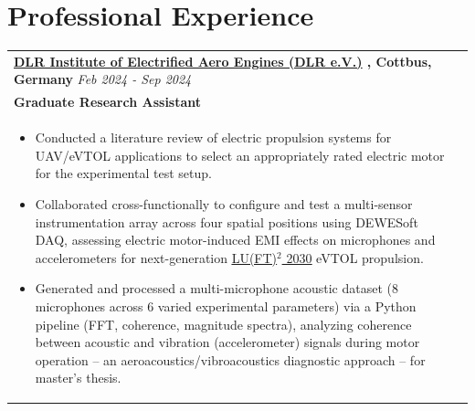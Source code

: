 \documentclass[a4paper,8pt]{article}
\newcommand{\ulhref}[2]{%
  {\hypersetup{urlcolor=.}\textcolor{.}{\href{#1}{\uline{#2}}}}%
}
\begin{document}
\section{Professional Experience}
\begin{tabularx}{\linewidth}{ @{}l r@{} }
\textbf{{\ulhref{https://www.dlr.de/}{DLR Institute of Electrified Aero Engines (DLR e.V.)}}, Cottbus, Germany} \hfill \color[HTML]{371e77} \textit{Feb 2024 - Sep 2024} \\[1pt]
\color[HTML]{371e77}\textbf{Graduate Research Assistant}\ \hfill \color[HTML]{4B28A4} \\[1pt]
\begin{minipage}[t]{\linewidth}
    \begin{itemize}[nosep,after=\strut, leftmargin=*, itemsep=1pt]
        \item Conducted a literature review of electric propulsion systems for UAV/eVTOL applications to select an appropriately rated electric motor for the experimental test setup.
        \item Collaborated cross-functionally to configure and test a multi-sensor instrumentation array across four spatial positions using DEWESoft DAQ, assessing electric motor-induced EMI effects on microphones and accelerometers for next-generation \ulhref{https://www.dlr.de/en/as/research-and-transfer/projects/lu-ft-2-2030-effective-and-sustainable-noise-reduction-on-existing-aircraft}{LU(FT)\(^2\) 2030} eVTOL propulsion.
        \item Generated and processed a multi-microphone acoustic dataset (8 microphones across 6 varied experimental parameters) via a Python pipeline (FFT, coherence, magnitude spectra), analyzing coherence between acoustic and vibration (accelerometer) signals during motor operation -- an aeroacoustics/vibroacoustics diagnostic approach -- for master's thesis.
    \end{itemize}
\end{minipage}
\end{tabularx}
\end{document}
